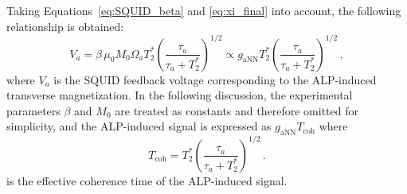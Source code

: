 Taking Equations~\eqref{eq:SQUID_beta} and \eqref{eq:xi_final} into account, the following relationship is obtained:
\begin{equation}
    V_a = \beta\,\mu_0 M_0 \Omega_a T_2^* \left(\frac{\tau_a}{\tau_a + T_2^*}\right)^{1/2} \propto g_{\mathrm{aNN}} T_2^* \left(\frac{\tau_a}{\tau_a + T_2^*}\right)^{1/2}
    \,,\label{eq:Va_gaNN_Tcoh}
\end{equation}
where $V_a$ is the SQUID feedback voltage corresponding to the ALP-induced transverse magnetization.
In the following discussion, the experimental parameters $\beta$ and $M_0$ are treated as constants and therefore omitted for simplicity, and the ALP-induced signal is expressed as $g_{\mathrm{aNN}} T_\mathrm{coh}$ where
\begin{equation}
    T_\mathrm{coh} = T_2^*  \left(\frac{\tau_a}{\tau_a + T_2^*}\right)^{1/2}
    \,.\label{eq:T_coh}
\end{equation}
is the effective coherence time of the ALP-induced signal.


